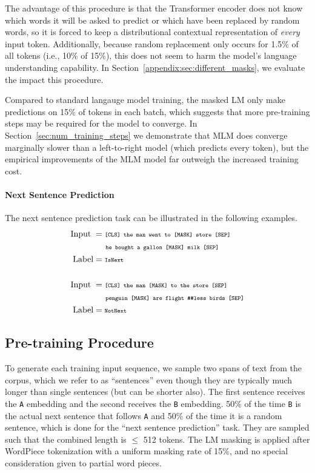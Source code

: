 The advantage of this procedure is that the Transformer encoder does not know which words it will be asked to predict or which have been replaced by random words, so it is forced to keep a distributional contextual representation of {\it every} input token. Additionally, because random replacement only occurs for 1.5\% of all tokens (i.e., 10\% of 15\%), this does not seem to harm the model's language understanding capability. In Section~\ref{appendix:sec:different_masks},
we evaluate the impact this procedure.

Compared to standard langauge model training, the masked LM only
make predictions on 15\% of tokens in each batch, which suggests that more pre-training steps may be required for the model to converge. In Section~\ref{sec:num_training_steps} we demonstrate that MLM does converge marginally slower than a left-to-right model (which predicts every token), but the empirical improvements of the MLM model far outweigh the increased training cost.

\paragraph{Next Sentence Prediction} 

The next sentence prediction task can be illustrated in the following examples.
\begin{align*}
\text{Input\;} &= \text{\tt {\scriptsize [CLS] the man went to [MASK] store [SEP]}} \\ 
& \text{\tt {\scriptsize \;\;\;\;\;\;\;he bought a gallon [MASK] milk [SEP]}}\\
\text{Label} &= \text{\tt {\scriptsize IsNext}} \\
\\
\text{Input\;} &= \text{\tt {\scriptsize [CLS] the man [MASK] to the store [SEP]}}\\
&\text{\tt {\scriptsize \;\;\;\;\;\;\;penguin [MASK] are flight \#\#less birds [SEP]}}\\
\text{Label} &= \text{\tt {\scriptsize NotNext}}
\end{align*}

\subsection{Pre-training Procedure}
\label{sec:pretraining_procedure}

To generate each training input sequence, we sample two spans of text from the corpus, which we refer to as ``sentences'' even though they are typically much longer than single sentences (but can be shorter also). The first sentence receives the {\tt A} embedding and the second receives the {\tt B} embedding. 50\% of the time {\tt B} is the actual next sentence that follows {\tt A} and 50\% of the time it is a random sentence, which is done for the ``next sentence prediction'' task. They are sampled such that the combined length is $\le$ 512 tokens. The LM masking is applied after WordPiece tokenization with a uniform masking rate of 15\%, and no special consideration given to partial word pieces.

